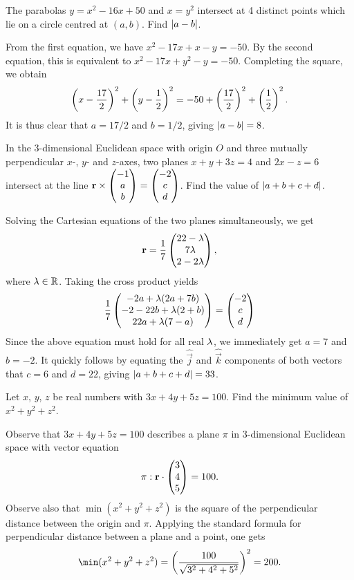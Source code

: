 \begin{question}[8]\label{Q::2023-O-1-7}
    The parabolas $y = x^2 - 16x + 50$ and $x = y^2$ intersect at 4 distinct points which lie on a circle centred at $(a, b)$. Find $\left\lvert a - b \right\rvert$.
\end{question}
\begin{solution*}
    From the first equation, we have $x^2 - 17x + x - y = -50$. By the second equation, this is equivalent to $x^2 - 17x + y^2 - y = -50$. Completing the square, we obtain \[\left( x - \frac{17}2 \right)^2 + \left( y - \frac12 \right)^2 = -50 + \left( \frac{17}{2} \right)^2 + \left( \frac12 \right)^2.\] It is thus clear that $a = 17/2$ and $b = 1/2$, giving $\left\lvert a - b \right\rvert = 8$.
\end{solution*}

\begin{question}[33]\label{Q::2023-O-1-8}
    In the 3-dimensional Euclidean space with origin $O$ and three mutually perpendicular $x$-, $y$- and $z$-axes, two planes $x + y + 3z = 4$ and $2x - z = 6$ intersect at the line $\mathbf{r} \times \begin{pmatrix} -1 \\ a \\ b \end{pmatrix} = \begin{pmatrix} -2 \\ c \\ d \end{pmatrix}$. Find the value of $\left\lvert a + b + c + d \right\rvert$.
\end{question}
\begin{solution*}
    Solving the Cartesian equations of the two planes simultaneously, we get \[\mathbf{r} = \dfrac17 \begin{pmatrix} 22-\lambda \\ 7\lambda \\ 2-2\lambda \end{pmatrix},\] where $\lambda \in \mathbb{R}$. Taking the cross product yields \[\dfrac17 \begin{pmatrix} -2a + \lambda(2a+7b) \\ -2-22b + \lambda(2+b) \\ 22a+\lambda(7-a) \end{pmatrix} = \begin{pmatrix} -2 \\ c \\ d \end{pmatrix}\] Since the above equation must hold for all real $\lambda$, we immediately get $a = 7$ and $b = -2$. It quickly follows by equating the $\hat {\vec j}$ and $\hat{\vec k}$ components of both vectors that $c = 6$ and $d = 22$, giving $\left\lvert a + b + c + d \right\rvert = 33$.
\end{solution*}

\begin{question}[200]\label{Q::2023-O-1-9}
    Let $x$, $y$, $z$ be real numbers with $3x + 4y + 5z = 100$. Find the minimum value of $x^2 + y^2 + z^2$.
\end{question}
\begin{solution*}
    Observe that $3x + 4y + 5z = 100$ describes a plane $\pi$ in 3-dimensional Euclidean space with vector equation \[\pi: \mathbf{r} \cdot \begin{pmatrix} 3 \\ 4 \\ 5 \end{pmatrix} = 100.\] Observe also that $\min(x^2 + y^2 + z^2)$ is the square of the perpendicular distance between the origin and $\pi$. Applying the standard formula for perpendicular distance between a plane and a point, one gets \[\min(x^2 + y^2 + z^2) = \bp{\dfrac{100}{\sqrt{3^2 + 4^2 + 5^2}}}^2 = 200.\]
\end{solution*}

